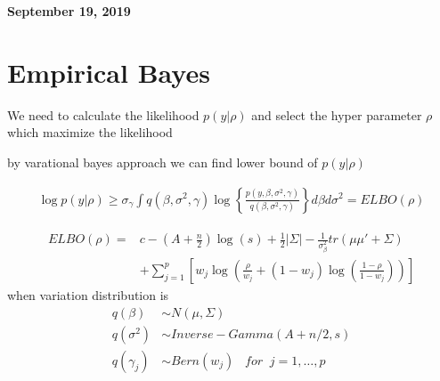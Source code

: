 \documentclass[11pt]{article}
\begin{document}
	
	
	
	\newcommand{\Ito}{$It\hat{o}$'$s~Lemma$}
	
	\newcommand\ind{\stackrel{\rm ind}{\sim}}
	\newcommand\iid{\stackrel{\rm iid}{\sim}}
	\renewcommand\c{\mathbf{c}}
	\newcommand\y{\mathbf{y}}
	\newcommand\z{\mathbf{z}}
	\renewcommand\P{\mathbf{P}}
	\newcommand\W{\mathbf{W}}
	\newcommand\X{\mathbf{X}}
	\newcommand\Y{\mathbf{Y}}
	\newcommand\Z{\mathbf{Z}}
	\newcommand\J{{\cal J}}
	\newcommand\B{{\cal B}}
	\newcommand\K{{\cal K}}
	\newcommand\N{{\rm N}}
	\newcommand\bs{\boldsymbol}
	\newcommand\bth{\bs\theta}
	\newcommand\bbe{\bs\beta}
	\renewcommand\*{^\star}
	
	\def\spacingset#1{\renewcommand{\baselinestretch}%
		{#1}\small\normalsize} \spacingset{1}
	
	
	
	\bigskip
	\bigskip
	\bigskip
	\begin{center}
		{\LARGE\bf September 19, 2019 }
	\end{center}
	\medskip
	
	
	
	\spacingset{1.45}
	
	
	
	\section{Empirical Bayes}
	We need to calculate the likelihood $p(y|\rho)$ and select the hyper parameter $\rho$ which maximize the likelihood
	
	by varational bayes approach we can find lower bound of $p(y|\rho)$
	
	\begin{align*}
	\log p(y|\rho) \ge \sigma_{\gamma} \int q(\beta,\sigma^2,\gamma) \log\left\{\frac{p(y,\beta,\sigma^2,\gamma)}{q(\beta,\sigma^2,\gamma)}\right\} d\beta d\sigma^2  = ELBO(\rho)
	\end{align*} 
	
	\begin{align*}
	ELBO(\rho) =& c -(A + \frac{n}{2}) \log(s) + \frac{1}{2}|\Sigma| - \frac{1}{\sigma_{\beta}^2} tr(\mu \mu' + \Sigma) \\
	& + \sum_{j=1}^{p} \left[ w_j \log\left(\frac{\rho}{w_j} + (1-w_j)\log\left( \frac{1-\rho}{1-w_j}\right)\right)\right]
	\end{align*}
	when variation distribution is
	\begin{align*}
	q(\beta) &\sim N(\mu,\Sigma)\\
	q(\sigma^2) &\sim Inverse-Gamma(A+n/2,s)\\
	q(\gamma_j) &\sim Bern(w_j) \;\;\; for \;\; j =1,\dots,p 
	\end{align*} 
	
\end{document}
